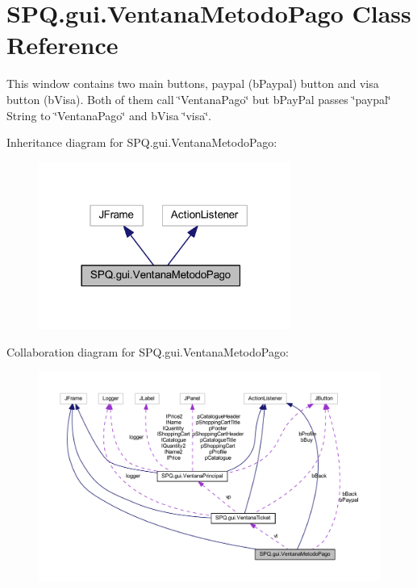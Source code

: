 \hypertarget{class_s_p_q_1_1gui_1_1_ventana_metodo_pago}{}\section{S\+P\+Q.\+gui.\+Ventana\+Metodo\+Pago Class Reference}
\label{class_s_p_q_1_1gui_1_1_ventana_metodo_pago}


This window contains two main buttons, paypal (b\+Paypal) button and visa button (b\+Visa). Both of them call \char`\"{}\+Ventana\+Pago\char`\"{} but b\+Pay\+Pal passes \char`\"{}paypal\char`\"{} String to \char`\"{}\+Ventana\+Pago\char`\"{} and b\+Visa \char`\"{}visa\char`\"{}.  




Inheritance diagram for S\+P\+Q.\+gui.\+Ventana\+Metodo\+Pago\+:\nopagebreak
\begin{figure}[H]
\begin{center}
\leavevmode
\includegraphics[width=234pt]{class_s_p_q_1_1gui_1_1_ventana_metodo_pago__inherit__graph}
\end{center}
\end{figure}


Collaboration diagram for S\+P\+Q.\+gui.\+Ventana\+Metodo\+Pago\+:\nopagebreak
\begin{figure}[H]
\begin{center}
\leavevmode
\includegraphics[width=350pt]{class_s_p_q_1_1gui_1_1_ventana_metodo_pago__coll__graph}
\end{center}
\end{figure}
